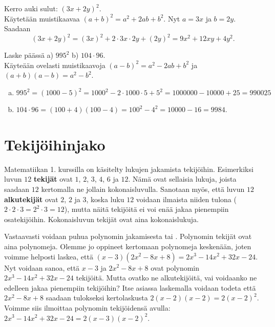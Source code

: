 \begin{esimerkki}
Kerro auki sulut: $(3x+2y)^2$. \\
Käytetään muistikaavaa $(a+b)^2 = a^2+2ab+b^2$. Nyt $a = 3x$ ja $b = 2y$.
Saadaan
        \[ (3x+2y)^2 = (3x)^2+2\cdot 3x\cdot 2y+(2y)^2 = 9x^2+12xy+4y^2. \]
\end{esimerkki}           
        
\begin{esimerkki}
Laske päässä a) $995^2$ b) $104 \cdot 96$. \\
Käyteään ovelasti muistikaavoja $(a-b)^2 = a^2-2ab+b^2$ ja $(a+b)(a-b) = a^2-b^2$.
\begin{enumerate}[a)]
\item $995^2 = (1000-5)^2 = 1000^2-2\cdot 1000\cdot 5+5^2 = 1000000-10000+25 = 990025 $
\item $104\cdot 96 = (100+4)(100-4) = 100^2 - 4^2 = 10000 - 16 = 9984$.
\end{enumerate}
\end{esimerkki} 


         
        
  

\section{Tekijöihinjako}

Matematiikan 1. kurssilla on käsitelty lukujen jakamista tekijöihin.
Esimerkiksi luvun $12$ {\bf tekijät} ovat $1$, $2$, $3$, $4$, $6$ ja $12$. Nämä ovat sellaisia
lukuja, joista saadaan $12$ kertomalla ne jollain kokonaisluvulla. Sanotaan myös, että luvun $12$
{\bf alkutekijät} ovat $2$, $2$ ja $3$, koska luku $12$ voidaan
ilmaista niiden tulona ($2\cdot 2\cdot 3 = 2^2\cdot 3 = 12$), mutta näitä tekijöitä ei
voi enää jakaa pienempiin osatekijöihin. Kokonaisluvun tekijät ovat aina kokonaislukuja.

Vastaavasti voidaan puhua polynomin jakamisesta  tai
. Polynomin tekijät
ovat aina polynomeja. Olemme jo oppineet kertomaan polynomeja keskenään,
joten voimme helposti laskea, että $(x-3)(2x^2-8x+8)=2x^3-14x^2+32x-24$.
Nyt voidaan sanoa, että $x-3$ ja $2x^2-8x+8$ ovat polynomin $2x^3-14x^2+32x-24$ tekijöitä.
Mutta ovatko ne alkutekijöitä, vai voidaanko ne edelleen jakaa pienempiin tekijöihin?
Itse asiassa laskemalla voidaan todeta että $2x^2-8x+8$ saadaan tulokseksi kertolaskusta $2(x-2)(x-2)=2(x-2)^2$.
Voimme siis ilmoittaa polynomin tekijöidensä avulla: $2x^3-14x^2+32x-24=2(x-3)(x-2)^2$.

